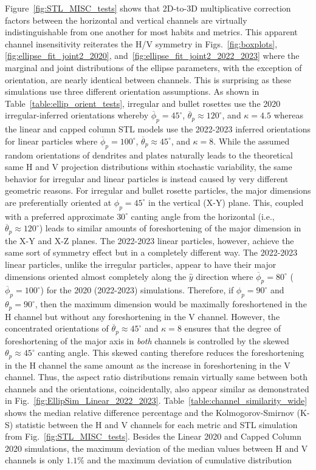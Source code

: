 \documentclass[amt, manuscript]{copernicus}
\begin{document}
Figure~\ref{fig:STL_MISC_tests} shows that 2D-to-3D multiplicative correction factors between the horizontal and vertical channels are virtually indistinguishable from one another for most habits and metrics. This apparent channel insensitivity reiterates the H/V symmetry in Figs.~\ref{fig:boxplots},  \ref{fig:ellipse_fit_joint2_2020}, and~\ref{fig:ellipse_fit_joint2_2022_2023} where the marginal and joint distributions of the ellipse parameters, with the exception of orientation, are nearly identical between  channels. This is surprising as these simulations use three different orientation assumptions. As shown in Table~\ref{table:ellip_orient_tests}, irregular and bullet rosettes use the 2020 irregular-inferred orientations whereby $\overline{\phi}_{p}=45^{\circ}$, $\overline{\theta}_{p}\approx 120^{\circ}$, and $\kappa=4.5$ whereas the linear and capped column STL models use the 2022-2023 inferred orientations for linear particles where $\overline{\phi}_{p}=100^{\circ}$, $\overline{\theta}_{p}\approx 45^{\circ}$, and $\kappa=8$. While the assumed random orientations of dendrites and plates naturally leads to the theoretical same H and V projection distributions within stochastic variability, the same behavior for irregular and linear particles is instead caused by very different geometric reasons. For irregular and bullet rosette particles, the major dimensions are preferentially oriented at $\phi_{p} = 45^{\circ}$ in the vertical (X-Y) plane. This, coupled with a preferred approximate $30^{\circ}$ canting angle from the horizontal (i.e., $\overline{\theta}_{p} \approx 120^{\circ}$) leads to similar amounts of foreshortening of the major dimension in the X-Y and X-Z planes. The 2022-2023 linear particles, however, achieve the same sort of symmetry effect but in a completely different way. The 2022-2023 linear particles, unlike the irregular particles, appear to have their major dimensions oriented almost completely along the $\hat{y}$ direction where $\overline{\phi}_{p} = 80^{\circ}$ ($\overline{\phi}_{p} = 100^{\circ}$) for the 2020 (2022-2023) simulations.  Therefore, if $\phi_{p}=90^{\circ}$ and $\theta_{p}=90^{\circ}$, then the maximum dimension would be maximally foreshortened in the H channel but without any foreshortening in the V channel. However, the concentrated orientations of $\overline{\theta}_{p} \approx 45^{\circ}$ and $\kappa = 8$ ensures that the degree of foreshortening of the major axis in \textit{both} channels is controlled by the skewed $\theta_{p} \approx 45^{\circ}$ canting angle. This skewed canting therefore reduces the foreshortening in the H channel the same amount as the increase in  foreshortening in the V channel. Thus, the aspect ratio distributions remain virtually same between both channels and the orientations, coincidentally, also appear similar as demonstrated in Fig.~\ref{fig:EllipSim_Linear_2022_2023}. Table~\ref{table:channel_similarity_wide} shows the median relative difference percentage and the Kolmogorov-Smirnov (K-S) statistic between the H and V channels for each metric and STL simulation from Fig.~\ref{fig:STL_MISC_tests}. Besides the Linear 2020 and Capped Column 2020 simulations, the maximum deviation of the median values between H and V channels is only $1.1\%$ and the maximum deviation of cumulative distribution 
\end{document}
